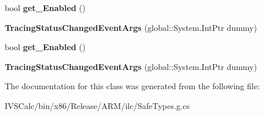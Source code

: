\begin{DoxyCompactItemize}
bool {\bfseries get\+\_\+\+Enabled} ()
\item 
\mbox{\label{class_windows_1_1_foundation_1_1_diagnostics_1_1_tracing_status_changed_event_args_aa1a5b7c3c249e8ce3683c7be6295b9db}} 
{\bfseries Tracing\+Status\+Changed\+Event\+Args} (global\+::\+System.\+Int\+Ptr dummy)
\item 
\mbox{\label{class_windows_1_1_foundation_1_1_diagnostics_1_1_tracing_status_changed_event_args_ad90566da4e10ef8ff537e88fa3fda83a}} 
bool {\bfseries get\+\_\+\+Enabled} ()
\item 
\mbox{\label{class_windows_1_1_foundation_1_1_diagnostics_1_1_tracing_status_changed_event_args_aa1a5b7c3c249e8ce3683c7be6295b9db}} 
{\bfseries Tracing\+Status\+Changed\+Event\+Args} (global\+::\+System.\+Int\+Ptr dummy)
\end{DoxyCompactItemize}


The documentation for this class was generated from the following file\+:\begin{DoxyCompactItemize}
\item 
I\+V\+S\+Calc/bin/x86/\+Release/\+A\+R\+M/ilc/Safe\+Types.\+g.\+cs\end{DoxyCompactItemize}
